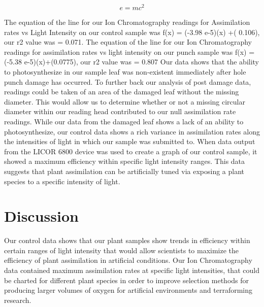 \documentclass[twoside,twocolumn]{article}
\begin{document}

\blindtext %

\begin{equation}
\label{eq:emc}
e = mc^2
\end{equation}

\blindtext %


The equation of the line for our Ion Chromatography readings for Assimilation rates vs Light Intensity on our control sample was f(x) = (-3.98 e-5)(x) +( 0.106), our r2 value was = 0.071.
The equation of the line for our Ion Chromatography readings for assimilation rates vs light intensity on our punch sample was f(x) = (-5.38 e-5)(x)+(0.0775), our r2 value was = 0.807
Our data shows that the ability to photosynthesize in our sample leaf was non-existent immediately after hole punch damage has occurred. To further back our analysis of post damage data, readings could be taken of an area of the damaged leaf without the missing diameter. This would allow us to determine whether or not a missing circular diameter within our reading head contributed to our null assimilation rate readings.
While our data from the damaged leaf shows a lack of an ability to photosynthesize, our control data shows a rich variance in assimilation rates along the intensities of light in which our sample was submitted to. When data output from the LICOR 6800 device was used to create a graph of our control sample, it showed a maximum efficiency within specific light intensity ranges. This data suggests that plant assimilation can be artificially tuned via exposing a plant species to a specific intensity of light.


\section{Discussion}

Our control data shows that our plant samples show trends in efficiency within certain ranges of light intensity that would allow scientists to maximize the efficiency of plant assimilation in artificial conditions. Our Ion Chromatography data contained maximum assimilation rates at specific light intensities, that could be charted for different plant species in order to improve selection methods for producing larger volumes of oxygen for artificial environments and terraforming research.
\end{document}
